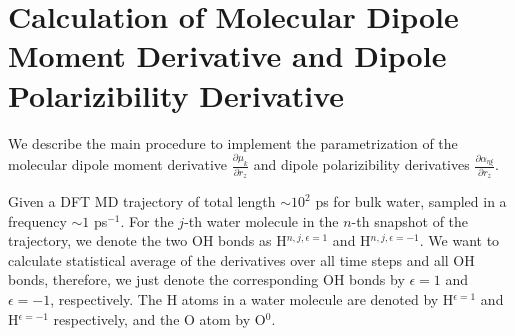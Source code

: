 \section{Calculation of Molecular Dipole Moment Derivative and Dipole Polarizibility Derivative} \label{CHAPETR_A_derivatives} 
We describe the main procedure to implement the parametrization of the molecular dipole moment 
derivative $\frac{\partial \mu_k}{\partial r_z}$ and dipole polarizibility derivatives $\frac{\partial\alpha_{\eta\xi}}{\partial r_z}$. 

Given a DFT MD trajectory of total length $\sim 10^2$ ps for bulk water, sampled in a frequency $\sim 1$ ps$^{-1}$.
For the $j$-th water molecule in the $n$-th snapshot of the trajectory, 
we denote the two OH bonds as H$^{n,j,\epsilon=1}$ and H$^{n,j,\epsilon=-1}$. We want to calculate statistical average of the
derivatives over all time steps and all OH bonds, therefore, 
we just denote the corresponding OH bonds by ${\epsilon=1}$ and ${\epsilon=-1}$, respectively. 
The H atoms in a water molecule are denoted by H$^{\epsilon=1}$ and H$^{\epsilon=-1}$ respectively, and the O atom by O$^{0}$.

